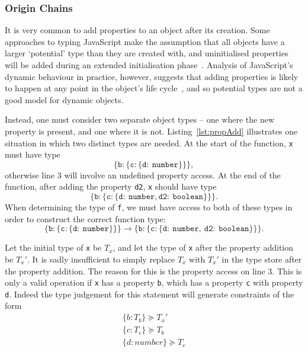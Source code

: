 \documentclass[12pt,a4paper,twoside,openright]{report}
\theoremstyle{definition}
\theoremstyle{dotless}
\newcommand*{\js}{\texttt}
\begin{document}
\subsubsection*{Origin Chains}
It is very common to add properties to an object
after its creation. Some approaches to typing JavaScript make the assumption
that all objects have a larger `potential' type than they are created with, and
uninitialised properties will be added during an extended initialisation
phase~\cite{anderson05}. Analysis of JavaScript's dynamic behaviour in
practice, however, suggests that adding properties is likely to happen at any
point in the object's life cycle~\cite{JSBehaviour}, and so potential types are
not a good model for dynamic objects.

Instead, one must consider two separate object types -- one where the new
property is present, and one where it is not. Listing~\ref{lst:propAdd}
illustrates one situation in which two distinct types are needed. At the start
of the function, \js{x} must have type $$\mathtt{\{b:\{c:\{d:\ number\}\}\}},$$
otherwise line 3 will involve an undefined property access. At the end of the
function, after adding the property \js{d2}, \js{x} should have type $$\mathtt{\{b:\{c:\{d:\ number, d2:\
  boolean\}\}\}}.$$ When determining the type
of \js{f}, we must have access to both of these types in order to construct the
correct function type: $$\mathtt{\{b:\{c:\{d:\ number\}\}\} \rightarrow
  \{b:\{c:\{d:\ number,\ d2:\ boolean\}\}\}}.$$

Let the initial type of \js{x} be $T_x$, and let the type of \js{x} after the
property addition be $T_x'$. It is sadly insufficient to simply replace $T_x$
with $T_x'$ in the type store after the property addition.  The reason for this
is the property access on line 3. This is only a valid operation if \js{x} has
a property \js{b}, which has a property \js{c} with property \js{d}. Indeed the
type judgement for this statement will generate constraints of the form 
\begin{equation}
  \begin{split}
 	\label{eq:barC}
 	\{b:T_b\} \succeq T_x' \\
 	\{c:T_c\} \succeq T_b \\
 	\{d:number\} \succeq T_c \\
  \end{split}
\end{equation}
\end{document}

